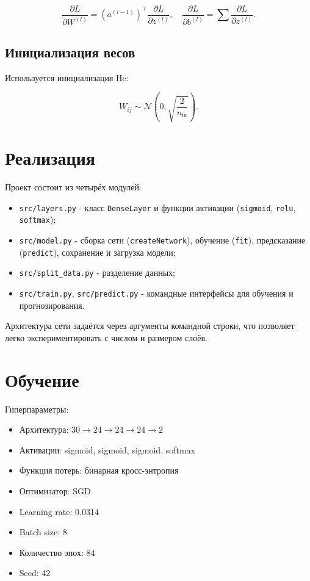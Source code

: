 \documentclass[12pt,a4paper]{article}
\begin{document}
\begin{equation}
\frac{\partial L}{\partial W^{(l)}} = (a^{(l-1)})^\top \frac{\partial L}{\partial z^{(l)}},
\quad
\frac{\partial L}{\partial b^{(l)}} = \sum \frac{\partial L}{\partial z^{(l)}}.
\end{equation}

\subsection{Инициализация весов}

Используется инициализация He:

\begin{equation}
W_{ij} \sim \mathcal{N}\left(0, \sqrt{\frac{2}{n_{\text{in}}}}\right).
\end{equation}

\section{Реализация}

Проект состоит из четырёх модулей:

\begin{itemize}
  \item \texttt{src/layers.py} - класс \texttt{DenseLayer} и функции активации
        (\texttt{sigmoid}, \texttt{relu}, \texttt{softmax});
  \item \texttt{src/model.py} - сборка сети (\texttt{createNetwork}), обучение
        (\texttt{fit}), предсказание (\texttt{predict}), сохранение и загрузка
        модели;
  \item \texttt{src/split\_data.py} - разделение данных;
  \item \texttt{src/train.py}, \texttt{src/predict.py} - командные интерфейсы
        для обучения и прогнозирования.
\end{itemize}

Архитектура сети задаётся через аргументы командной строки, что позволяет
легко экспериментировать с числом и размером слоёв.

\section{Обучение}

Гиперпараметры:

\begin{itemize}
  \item Архитектура: $30 \to 24 \to 24 \to 24 \to 2$
  \item Активации: sigmoid, sigmoid, sigmoid, softmax
  \item Функция потерь: бинарная кросс-энтропия
  \item Оптимизатор: SGD
  \item Learning rate: 0.0314
  \item Batch size: 8
  \item Количество эпох: 84
  \item Seed: 42
\end{itemize}
\end{document}
